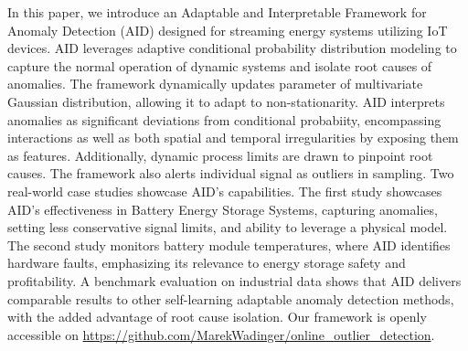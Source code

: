 In this paper, we introduce an Adaptable and Interpretable Framework for Anomaly Detection (AID) designed for streaming energy systems utilizing IoT devices. AID leverages adaptive conditional probability distribution modeling to capture the normal operation of dynamic systems and isolate root causes of anomalies. The framework dynamically updates parameter of multivariate Gaussian distribution, allowing it to adapt to non-stationarity. AID interprets anomalies as significant deviations from conditional probabiity, encompassing interactions as well as both spatial and temporal irregularities by exposing them as features. Additionally, dynamic process limits are drawn to pinpoint root causes. The framework also alerts individual signal as outliers in sampling. Two real-world case studies showcase AID's capabilities. The first study showcases AID's effectiveness in Battery Energy Storage Systems, capturing anomalies, setting less conservative signal limits, and ability to leverage a physical model. The second study monitors battery module temperatures, where AID identifies hardware faults, emphasizing its relevance to energy storage safety and profitability. A benchmark evaluation on industrial data shows that AID delivers comparable results to other self-learning adaptable anomaly detection methods, with the added advantage of root cause isolation. Our framework is openly accessible on \url{https://github.com/MarekWadinger/online_outlier_detection}.%
